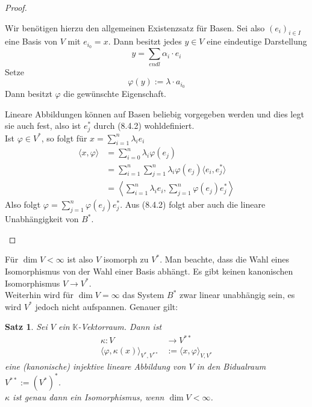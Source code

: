 \documentclass[12pt,a4paper]{article}
\newtheorem{theorem}{Satz}
\theoremstyle{definition}
\theoremstyle{remark}
\begin{document}
	\begin{proof}
		\begin{proofenum}
			\item
				Wir benötigen hierzu den allgemeinen Existenzsatz für Basen. Sei also $(e_i)_{i \in I}$ eine Basis von $V$ mit $e_{i_0}=x$. Dann besitzt jedes $y \in V$ eine eindeutige Darstellung
				\begin{equation}
					y = \sum_{endl} \alpha_i \cdot e_i
				\end{equation}
				Setze
				\begin{equation}
					\varphi(y):= \lambda \cdot a_{i_0}
				\end{equation}
				Dann besitzt $\varphi$ die gewünschte Eigenschaft.
			\item
				Lineare Abbildungen können auf Basen beliebig vorgegeben werden und dies legt sie auch fest, also ist $e_j^*$ durch (8.4.2) wohldefiniert. \\
				Ist $\varphi \in V^*$, so folgt für $x = \sum_{i=1}^n \lambda_i e_i$
				\begin{equation}
					\begin{split}
						\langle x, \varphi \rangle &= \sum_{i=0}^n \lambda_i \varphi(e_j) \\
						&= \sum_{i =1}^n \sum_{j=1}^n \lambda_i \varphi(e_j) \langle e_i, e_j^* \rangle \\
						&= \left\langle \sum_{i =1}^n \lambda_i e_i, \sum_{j =1}^n \varphi(e_j) e_j^* \right\rangle
					\end{split}
				\end{equation}
				Also folgt $\varphi = \sum_{j =1}^n \varphi(e_j) e_j^*$. Aus (8.4.2) folgt aber auch die lineare Unabhängigkeit von $B^*$.
		\end{proofenum}
	\end{proof}
	Für $\dim V < \infty$ ist also $V$ isomorph zu $V^*$. Man beachte, dass die Wahl eines Isomorphismus von der Wahl einer Basis abhängt. Es gibt keinen kanonischen Isomorphismus $V \rightarrow V^*$. \\
	Weiterhin wird für $\dim V = \infty$ das System $B^*$ zwar linear unabhängig sein, es wird $V^*$ jedoch nicht aufspannen. Genauer gilt:
	\begin{theorem}
		Sei $V$ ein $\mathbb{K}$-Vektorraum. Dann ist
		\begin{equation}
			\begin{split}
				\kappa: V &\rightarrow V^{**} \\
				\langle \varphi, \kappa(x) \rangle_{V^*,V^{**}} &:= \langle x, \varphi \rangle_{V, V^*}
			\end{split}
		\end{equation}
		eine (kanonische) injektive lineare Abbildung von $V$ in den Bidualraum $V^{**}:= (V^*)^*$. \\
		$\kappa$ ist genau dann ein Isomorphismus, wenn $\dim V < \infty$.
	\end{theorem}
\end{document}

